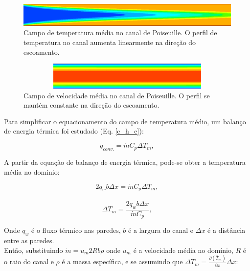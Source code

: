 \begin{figure}[h!]
	\centering
	\includegraphics[angle=0, scale=0.4]{cap_fundamentacao/temperatura.png}
	\caption{Campo de temperatura média no canal de Poiseuille. O perfil de temperatura no canal aumenta linearmente na direção do escoamento.}
	\label{figure.2}
\end{figure}
\begin{figure}[h!]
	\centering
	\includegraphics[angle=0, height=1.35cm , width=12.3cm]{cap_fundamentacao/velocidade.png}
	\caption{Campo de velocidade média no canal de Poiseuille. O perfil se mantém constante na direção do escoamento.}
	\label{figure.3}
\end{figure}

Para simplificar o equacionamento do campo de temperatura médio, um balanço de energia térmica foi estudado (Eq. \ref{c_h_e}):

\begin{equation}\label{c_h_e}
q_{conv.} = \dot{m} C_p \Delta T_m,
\end{equation}

A partir da equação de balanço de energia térmica, pode-se obter a temperatura média no domínio:

\begin{equation}
2q_w b \Delta x = \dot{m} C_p \Delta T_m,
\end{equation}\\

\begin{equation}
\Delta T_m = \frac{2q_w b \Delta x}{\dot{m} C_p},
\end{equation}

Onde $q_w$ é o fluxo térmico nas paredes, $b$ é a largura do canal e $\Delta x$ é a distância entre as paredes.\\
Então, substituindo $ \dot{m} = u_m 2R b \rho $ onde $u_m$ é a velocidade média no domínio, $R$ é o raio do canal e $\rho$ é a massa específica, e se assumindo que $ \Delta T_m = \frac{\partial{\left(\overline{T}_m\right)}}{\partial{x}} \Delta x $: 

